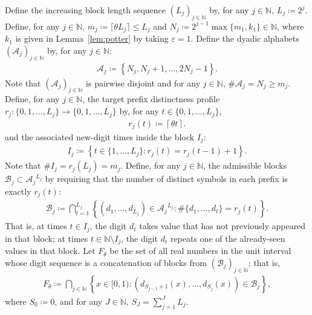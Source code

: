 \documentclass[12pt,reqno]{amsart}
\theoremstyle{definition}
\theoremstyle{plain}
\begin{document}
Define the increasing block length sequence $(L_j)_{j\in\mathbb{N}}$ by, for any $j\in\mathbb{N}$, $L_j\coloneqq 2^j$. 
Define, for any $j\in\mathbb{N}$, $m_j\coloneqq \lceil \theta L_j\rceil\leq L_j$ and $N_j\coloneqq 2^{j-1}\max{\{m_1,k_1\}}\in\mathbb{N}$, where $k_1$ is given in Lemma~\ref{lem:potter} by taking $\varepsilon=1$. 
Define the dyadic alphabets $(\mathcal{A}_j)_{j\in\mathbb{N}}$ by, for any $j\in\mathbb{N}$:
\begin{align*}
    \mathcal{A}_j\coloneqq \left\{N_j,N_j+1,\ldots,2N_j-1\right\}.
\end{align*}
Note that $(\mathcal{A}_j)_{j\in\mathbb{N}}$ is pairwise disjoint and for any $j\in\mathbb{N}$, $\#\mathcal{A}_j=N_j\geq m_j$.
Define, for any $j\in\mathbb{N}$, the target prefix distinctness profile $r_{j}:\{0,1,\ldots,L_j\}\to\{0,1,\ldots,L_j\}$ by, for any $t\in\{0,1,\ldots,L_j\}$,
\begin{align*}
    r_j(t)\coloneqq \left\lceil \theta t\right\rceil.
\end{align*}
and the associated new-digit times inside the block $I_j$:
\begin{align*}
    I_j\coloneqq\left\{t\in\{1,\ldots,L_j\}:r_j(t)=r_j(t-1)+1\right\}.
\end{align*}
Note that $\# I_j=r_j(L_j)=m_j$.
Define, for any $j\in\mathbb{N}$, the admissible blocks $\mathcal{B}_j\subset {\mathcal{A}_j}^{L_j}$ by requiring that the number of distinct symbols in each prefix is exactly $r_j(t)$:
\begin{align*}
    \mathcal{B}_j
    \coloneqq\bigcap_{t=1}^{L_j}\left\{(d_1,\ldots,d_{L_j})\in{\mathcal{A}_j}^{L_j}:\#\{d_1,\ldots,d_{t}\}=r_j(t)\right\}.
\end{align*}
That is, at times $t\in I_j$, the digit $d_t$ takes value that has not previously appeared in that block; at times $t\in \mathbb{N}\setminus I_j$, the digit $d_t$ repeats one of the already-seen values in that block.
Let $F_\theta$ be the set of all real numbers in the unit interval whose digit sequence is a concatenation of blocks from $(\mathcal{B}_j)_{j\in\mathbb{N}}$; that is,
\begin{align*}
    F_\theta
    \coloneqq
    \bigcap_{j\in\mathbb{N}}\left\{x\in[0,1):(d_{S_{j-1}+1}(x),\ldots,d_{S_j}(x))\in\mathcal{B}_j\right\},
\end{align*}
where $S_0\coloneqq 0$, and for any $J\in\mathbb{N}$, $S_{J}=\sum_{j=1}^J L_j$.
\end{document}
